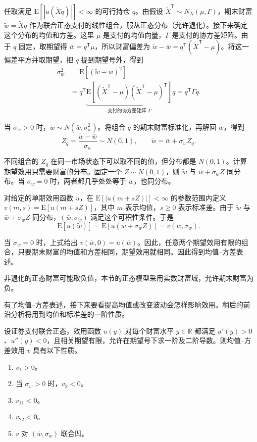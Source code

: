 \begin{solution}[label-content={证明},blank-type=none]
任取满足 $\mathrm E[|u(\widetilde Xq)|]<\infty$ 的可行持仓 $q$。由假设 $\widetilde X^{\mathsf T}\sim N_N(\mu,\Gamma)$，期末财富 $\widetilde w=\widetilde Xq$ 作为联合正态支付的线性组合，服从正态分布（允许退化）。接下来确定这个分布的均值和方差。这里 $\mu$ 是支付的均值向量，$\Gamma$ 是支付的协方差矩阵。由于 $q$ 固定，取期望得 $\bar w=q^{\mathsf T}\mu$，所以财富偏差为 $\widetilde w-\bar w=q^{\mathsf T}(\widetilde X^{\mathsf T}-\mu)$。将这一偏差平方并取期望，把 $q$ 提到期望号外，得到
\[
 \begin{aligned}
 \sigma_w^2
 &=\mathrm E[(\widetilde w-\bar w)^2]\\
 &=q^{\mathsf T}
   \underbrace{\mathrm E\!\left[
   (\widetilde X^{\mathsf T}-\mu)(\widetilde X^{\mathsf T}-\mu)^{\mathsf T}
   \right]}_{\text{支付的协方差矩阵 }\Gamma}
   q
 =q^{\mathsf T}\Gamma q.
 \end{aligned}
\]

当 $\sigma_w>0$ 时，$\widetilde w\sim N(\bar w,\sigma_w^2)$。将组合 $q$ 的期末财富标准化，再解回 $\widetilde w$，得到
\[
 Z_q=\frac{\widetilde w-\bar w}{\sigma_w}\sim N(0,1),
 \qquad \widetilde w=\bar w+\sigma_w Z_q.
\]

不同组合的 $Z_q$ 在同一市场状态下可以取不同的值，但分布都是 $N(0,1)$。计算期望效用只需要财富的分布。固定一个 $Z\sim N(0,1)$，则 $\widetilde w$ 与 $\bar w+\sigma_w Z$ 同分布。当 $\sigma_w=0$ 时，两者都几乎处处等于 $\bar w$，也同分布。

对给定的单期效用函数 $u$，在 $\mathrm E[|u(m+sZ)|]<\infty$ 的参数范围内定义 $v(m,s)=\mathrm E[u(m+sZ)]$，其中 $m$ 表示均值，$s\ge0$ 表示标准差。由于 $\widetilde w$ 与 $\bar w+\sigma_w Z$ 同分布，$(\bar w,\sigma_w)$ 满足这个可积性条件。于是
\[
 \mathrm E[u(\widetilde w)]
 =\mathrm E[u(\bar w+\sigma_w Z)]
 =v(\bar w,\sigma_w).
\]

当 $\sigma_w=0$ 时，上式给出 $v(\bar w,0)=u(\bar w)$。因此，任意两个期望效用有限的组合，只要期末财富的均值和方差相同，期望效用就相同。因此得到均值--方差表述。
\end{solution}

非退化的正态财富可能取负值，本节的正态模型采用实数财富域，允许期末财富为负。

有了均值--方差表述，接下来要看提高均值或改变波动会怎样影响效用。稍后的前沿分析将用到均值和标准差的一阶性质。
\begin{tcolorbox}[knowledge]
 设证券支付联合正态，效用函数 $u(y)$ 对每个财富水平 $y\in\mathbb R$ 都满足 $u'(y)>0$、$u''(y)<0$，且相关期望有限，允许在期望号下求一阶及二阶导数。则均值--方差效用 $v$ 具有以下性质。
\begin{enumerate}[label=(\arabic*)]
 \item $v_1>0$。
 \item 当 $\sigma_w>0$ 时，$v_2<0$。
 \item $v_{11}<0$。
 \item $v_{22}<0$。
 \item $v$ 对 $(\bar w,\sigma_w)$ 联合凹。
\end{enumerate}
\end{tcolorbox}

